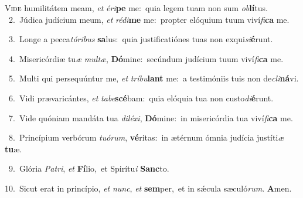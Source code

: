 \lettrine{\initial\textcolor{\initialcolor}{V}}{ide} humilitátem meam, \textit{et} \textit{é}\-\textit{ri}\textbf{pe} me:~\star quia legem tuam non sum \textit{ob}\-\textbf{lí}tus.\\
{\numbfont\textcolor{\numbcolor}{~2.}}~Júdica judícium meum, \textit{et} \textit{réd}\-\textit{i}\textbf{me} me:~\star propter elóquium tuum viví\-\textit{fi}\-\textbf{ca} me.\par
{\numbfont\textcolor{\numbcolor}{~3.}}~Longe a pecca\-\textit{tó}\-\textit{ri}\textit{bus} \textbf{sa}\-lus:~\star quia justificatiónes tuas non exqui\-\textit{si}\-\textbf{é}runt.\par
{\numbfont\textcolor{\numbcolor}{~4.}}~Misericórdiæ tu\textit{æ} \textit{mul}\-\textit{tæ}, \textbf{Dó}\-mine:~\star secúndum judícium tuum viví\-\textit{fi}\-\textbf{ca} me.\par
{\numbfont\textcolor{\numbcolor}{~5.}}~Multi qui persequúntur me, \textit{et} \textit{trí}\-\textit{bu}\textbf{lant} me:~\star a testimóniis tuis non de\-\textit{cli}\-\textbf{ná}vi.\par
{\numbfont\textcolor{\numbcolor}{~6.}}~Vidi prævaricántes, \textit{et} \textit{ta}\-\textit{be}\textbf{scé}bam:~\star quia elóquia tua non custo\-\textit{di}\-\textbf{é}runt.\par
{\numbfont\textcolor{\numbcolor}{~7.}}~Vide quóniam mandáta tua \textit{di}\-\textit{lé}\textit{xi}, \textbf{Dó}\-mine:~\star in misericórdia tua viví\-\textit{fi}\-\textbf{ca} me.\par
{\numbfont\textcolor{\numbcolor}{~8.}}~Princípium verbórum \textit{tu}\-\textit{ó}\textit{rum}, \textbf{vé}\-ritas:~\star in ætérnum ómnia judícia justíti\textit{æ} \textbf{tu}\-æ.\par
{\numbfont\textcolor{\numbcolor}{~9.}}~Glória \textit{Pa}\-\textit{tri}, \textit{et} \textbf{Fí}\-lio,~\star et Spirítu\textit{i} \textbf{Sanc}\-to.\par
{\numbfont\textcolor{\numbcolor}{10.}}~Sicut erat in princípio, \textit{et} \textit{nunc}\-, \textit{et} \textbf{sem}\-per,~\star et in sǽcula sæculó\-\textit{rum}\-. \textbf{A}\-men.\par
